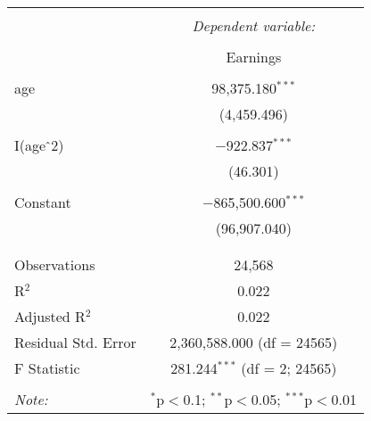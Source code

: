 
\begin{table}[!htbp] \centering 
  \caption{} 
  \label{} 
\begin{tabular}{@{\extracolsep{5pt}}lc} 
\\[-1.8ex]\hline 
\hline \\[-1.8ex] 
 & \multicolumn{1}{c}{\textit{Dependent variable:}} \\ 
\cline{2-2} 
\\[-1.8ex] & Earnings \\ 
\hline \\[-1.8ex] 
 age & 98,375.180$^{***}$ \\ 
  & (4,459.496) \\ 
  & \\ 
 I(age$\hat{\mkern6mu}$2) & $-$922.837$^{***}$ \\ 
  & (46.301) \\ 
  & \\ 
 Constant & $-$865,500.600$^{***}$ \\ 
  & (96,907.040) \\ 
  & \\ 
\hline \\[-1.8ex] 
Observations & 24,568 \\ 
R$^{2}$ & 0.022 \\ 
Adjusted R$^{2}$ & 0.022 \\ 
Residual Std. Error & 2,360,588.000 (df = 24565) \\ 
F Statistic & 281.244$^{***}$ (df = 2; 24565) \\ 
\hline 
\hline \\[-1.8ex] 
\textit{Note:}  & \multicolumn{1}{r}{$^{*}$p$<$0.1; $^{**}$p$<$0.05; $^{***}$p$<$0.01} \\ 
\end{tabular} 
\end{table} 
